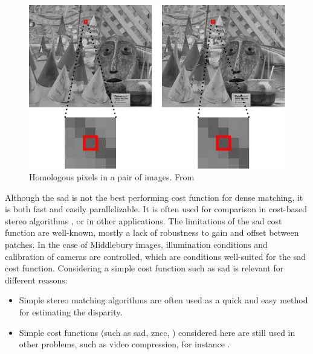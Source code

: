 \begin{figure}[ht]
  \centering
  \includegraphics[width=0.8\linewidth]{Images/Chap_4/Cones.png}
  \caption{Homologous pixels in a pair of images. From \cite{malinowski_uncertainty_2024}}\label{fig:Cones}
\end{figure}

\begin{remark}
    Although the \acrshort{sad} is not the best performing cost function for dense matching, it is both fast and easily parallelizable. It is often used for comparison in cost-based stereo algorithms \cite{hirschmuller_evaluation_2007, zbontar_stereo_2016}, or in other applications. The limitations of the \acrshort{sad} cost function are well-known, \ie mostly a lack of robustness to gain and offset between patches. In the case of Middlebury images, illumination conditions and calibration of cameras are controlled, which are conditions well-suited for the \acrshort{sad} cost function.
    Considering a simple cost function such as \acrshort{sad} is relevant for different reasons:
    \begin{itemize}
        \item Simple stereo matching algorithms are often used as a quick and easy method for estimating the disparity.
        \item Simple cost functions (such as \acrshort{sad}, \acrshort{zncc}, \etc) considered here are still used in other problems, such as video compression, for instance \cite{richardson_h264_2006}.
    \end{itemize}
\end{remark}

